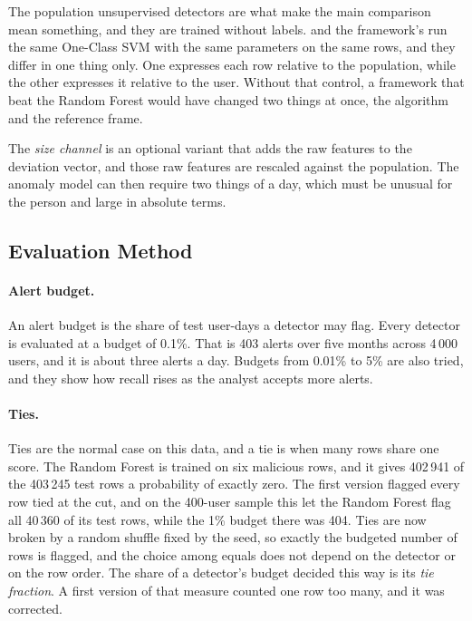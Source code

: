 \documentclass[a4paper,12pt]{article}
\begin{document}
The population unsupervised detectors are what make the main comparison mean something, and they are trained without labels.  and the framework's  run the same One-Class SVM with the same parameters on the same rows, and they differ in one thing only. One expresses each row relative to the population, while the other expresses it relative to the user. Without that control, a framework that beat the Random Forest would have changed two things at once, the algorithm and the reference frame.

The \emph{size channel} is an optional variant that adds the raw features to the deviation vector, and those raw features are rescaled against the population. The anomaly model can then require two things of a day, which must be unusual for the person and large in absolute terms.

\subsection{Evaluation Method}
\label{sec:evaluation_protocol}
\paragraph{Alert budget.} An alert budget is the share of test user-days a detector may flag. Every detector is evaluated at a budget of 0.1\%. That is 403 alerts over five months across 4\,000 users, and it is about three alerts a day. Budgets from 0.01\% to 5\% are also tried, and they show how recall rises as the analyst accepts more alerts.

\paragraph{Ties.} Ties are the normal case on this data, and a tie is when many rows share one score. The Random Forest is trained on six malicious rows, and it gives 402\,941 of the 403\,245 test rows a probability of exactly zero. The first version flagged every row tied at the cut, and on the 400-user sample this let the Random Forest flag all 40\,360 of its test rows, while the 1\% budget there was 404. Ties are now broken by a random shuffle fixed by the seed, so exactly the budgeted number of rows is flagged, and the choice among equals does not depend on the detector or on the row order. The share of a detector's budget decided this way is its \emph{tie fraction}. A first version of that measure counted one row too many, and it was corrected.
\end{document}
